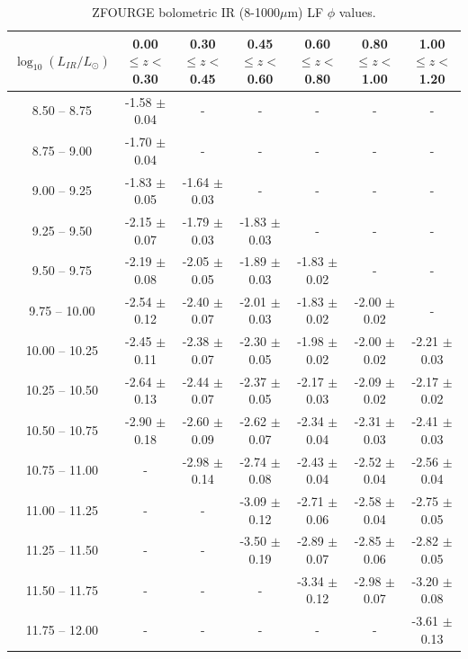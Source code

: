 \begin{table}
    \begin{center}
    \caption{ZFOURGE bolometric IR (8-1000$\mu$m) LF $\phi$ values.}
    \label{Tab: ZF LF}
    \begin{tabular}{@{}ccccccc@{}}
        \toprule
        $\log_{10}(L_{IR}/L_{\odot})$ & 0.00 $\leq z <$ 0.30 & 0.30 $\leq z <$ 0.45 & 0.45 $\leq z <$ 0.60 & 0.60 $\leq z <$ 0.80 & 0.80 $\leq z <$ 1.00 & 1.00 $\leq z <$ 1.20 \\
        \hline
         8.50 --  8.75 & -1.58 $\pm$ 0.04 & - & - & - & - & - \\
         8.75 --  9.00 & -1.70 $\pm$ 0.04 & - & - & - & - & - \\
         9.00 --  9.25 & -1.83 $\pm$ 0.05 & -1.64 $\pm$ 0.03 & - & - & - & - \\
         9.25 --  9.50 & -2.15 $\pm$ 0.07 & -1.79 $\pm$ 0.03 & -1.83 $\pm$ 0.03 & - & - & - \\
         9.50 --  9.75 & -2.19 $\pm$ 0.08 & -2.05 $\pm$ 0.05 & -1.89 $\pm$ 0.03 & -1.83 $\pm$ 0.02 & - & - \\
         9.75 -- 10.00 & -2.54 $\pm$ 0.12 & -2.40 $\pm$ 0.07 & -2.01 $\pm$ 0.03 & -1.83 $\pm$ 0.02 & -2.00 $\pm$ 0.02 & - \\
        10.00 -- 10.25 & -2.45 $\pm$ 0.11 & -2.38 $\pm$ 0.07 & -2.30 $\pm$ 0.05 & -1.98 $\pm$ 0.02 & -2.00 $\pm$ 0.02 & -2.21 $\pm$ 0.03 \\
        10.25 -- 10.50 & -2.64 $\pm$ 0.13 & -2.44 $\pm$ 0.07 & -2.37 $\pm$ 0.05 & -2.17 $\pm$ 0.03 & -2.09 $\pm$ 0.02 & -2.17 $\pm$ 0.02 \\
        10.50 -- 10.75 & -2.90 $\pm$ 0.18 & -2.60 $\pm$ 0.09 & -2.62 $\pm$ 0.07 & -2.34 $\pm$ 0.04 & -2.31 $\pm$ 0.03 & -2.41 $\pm$ 0.03 \\
        10.75 -- 11.00 & -                & -2.98 $\pm$ 0.14 & -2.74 $\pm$ 0.08 & -2.43 $\pm$ 0.04 & -2.52 $\pm$ 0.04 & -2.56 $\pm$ 0.04 \\
        11.00 -- 11.25 & -                & -                & -3.09 $\pm$ 0.12 & -2.71 $\pm$ 0.06 & -2.58 $\pm$ 0.04 & -2.75 $\pm$ 0.05 \\
        11.25 -- 11.50 & -                & -                & -3.50 $\pm$ 0.19 & -2.89 $\pm$ 0.07 & -2.85 $\pm$ 0.06 & -2.82 $\pm$ 0.05 \\
        11.50 -- 11.75 & -                & -                & -                & -3.34 $\pm$ 0.12 & -2.98 $\pm$ 0.07 & -3.20 $\pm$ 0.08 \\
        11.75 -- 12.00 & -                & -                & -                & -                & -                & -3.61 $\pm$ 0.13 \\

\end{tabular}
\end{center}
\end{table}

